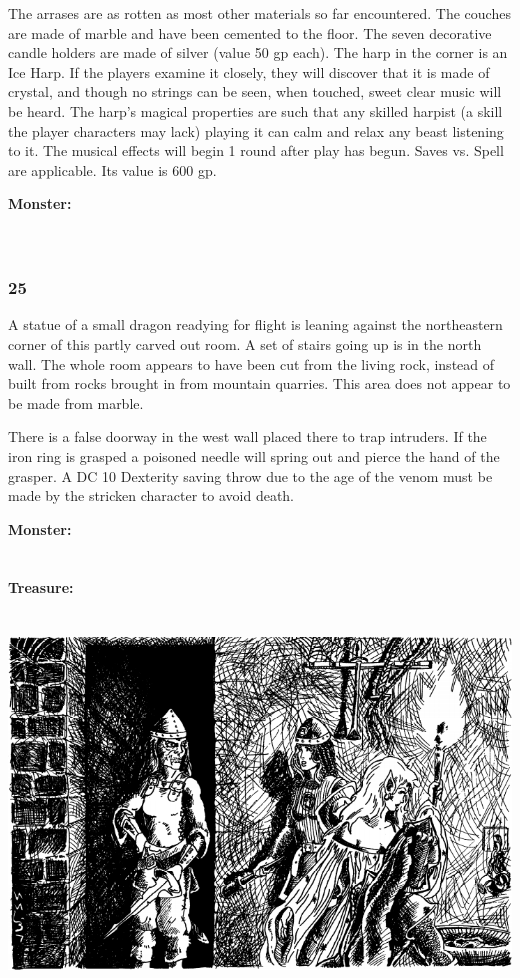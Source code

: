 \documentclass[palace_of_the_silver_princess]{subfiles}
\begin{document}
The arrases are as rotten as most other materials so far encountered.
The couches are made of marble and have been cemented to the floor. The
seven decorative candle holders are made of silver (value 50 gp each).
The harp in the corner is an Ice Harp. If the players examine it
closely, they will discover that it is made of crystal, and though no
strings can be seen, when touched, sweet clear music will be heard. The
harp’s magical properties are such that any skilled harpist (a skill the
player characters may lack) playing it can calm and relax any beast
listening to it. The musical effects will begin 1 round after play has
begun. Saves vs. Spell are applicable. Its value is 600 gp.

\textbf{Monster:}
\\
\\
\\

\subsubsection{25}
\begin{quotebox}
    A statue of a small dragon readying for flight is leaning against
    the northeastern corner of this partly carved out room. A set of
    stairs going up is in the north wall. The whole room appears to have
    been cut from the living rock, instead of built from rocks brought
    in from mountain quarries. This area does not appear to be made from
    marble.
\end{quotebox}

There is a false doorway in the west wall placed there to trap
intruders. If the iron ring is grasped a poisoned needle will spring out
and pierce the hand of the grasper. A DC 10 Dexterity saving throw due
to the age of the venom must be made by the stricken character to avoid
death.

\textbf{Monster:}
\\
\\
\\
\textbf{Treasure:}
\\
\\
\\

\includegraphics[width=\columnwidth]{img/travis.png}
\end{document}
